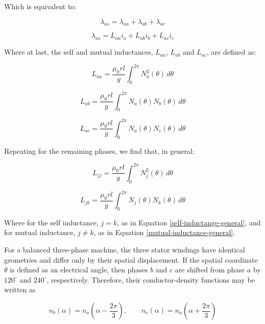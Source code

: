 \documentclass{article}
\begin{document}
Which is equivalent to:

\begin{equation}
    \lambda_{as} = \lambda_{aa} + \lambda_{ab} + \lambda_{ac}
\end{equation}

\begin{equation}
    \lambda_{as} = L_{aa} i_a + L_{ab} i_b + L_{ac} i_c
\end{equation}

Where at last, the self and mutual inductances, $L_{aa}$, $L_{ab}$ and $L_{ac}$, are defined as:

\begin{equation}
    L_{aa} = \frac{\mu_0 r l}{g} \int_{0}^{2\pi} N_a^2(\theta) \, d\theta
\end{equation}

\begin{equation}
    L_{ab} = \frac{\mu_0 r l}{g} \int_{0}^{2\pi} N_a(\theta) N_b(\theta) \, d\theta
\end{equation}

\begin{equation}
    L_{ac} = \frac{\mu_0 r l}{g} \int_{0}^{2\pi} N_a(\theta) N_c(\theta) \, d\theta
\end{equation}

Repeating for the remaining phases, we find that, in general:

\begin{equation}
\label{self-inductange-general}
    L_{jj} = \frac{\mu_0 r l}{g} \int_{0}^{2\pi} N_j^2(\theta) \, d\theta
\end{equation}

\begin{equation}
\label{mutual-inductance-general}
    L_{jk} = \frac{\mu_0 r l}{g} \int_{0}^{2\pi} N_j(\theta) N_k(\theta) \, d\theta
\end{equation}

Where for the self inductance, $j = k$, as in Equation \ref{self-inductange-general}, and for mutual inductance, $j \neq k$, as in Equation \ref{mutual-inductance-general}.

For a balanced three-phase machine, the three stator windings have identical geometries and differ only by their spatial displacement. If the spatial coordinate $\theta$ is defined as an electrical angle, then phases $b$ and $c$ are shifted from phase $a$ by $120^\circ$ and $240^\circ$, respectively. Therefore, their conductor-density functions may be written as

\begin{equation}
    n_b(\alpha) = n_a\left(\alpha - \frac{2\pi}{3}\right), \qquad
    n_c(\alpha) = n_a\left(\alpha + \frac{2\pi}{3}\right)
\end{equation}
\end{document}
